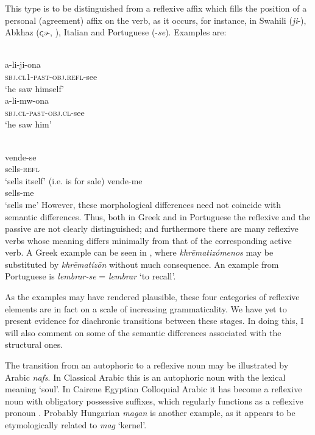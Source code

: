 This type is to be distinguished from a reflexive affix which fills the position of a personal (agreement) affix on the verb, as it occurs, for instance, in Swahili (\textit{ji}{}-), Abkhaz (\textit{\k{c}ə}{}-, \citealt[77]{Hewitt1979}), Italian and Portuguese (-\textit{se}). Examples are:

\ea\label{ex:E19}
\langinfo{\LangSwah}{}{} \\
 \ea
 \gll a-li-ji-ona  \\
\textsc{sbj}.\textsc{cl}1-\textsc{past}-\textsc{obj}.\textsc{refl}-see\\
\glt ‘he saw himself’\\
\ex
\gll a-li-mw-ona \\
 \textsc{sbj}.\textsc{cl}-\textsc{past}-\textsc{obj}.\textsc{cl}-see \\
 \glt ‘he saw him’\\
\z
\z


\ea\label{ex:E20}
\langinfo{\LangPort}{}{}  \\
 \ea
 \gll vende-se  \\
 sells-\textsc{refl}  \\
\glt ‘sells itself’ (i.e. is for sale)
\ex 
\gll vende-me \\
sells-me \\
\glt ‘sells me’
\z
\z
\noindent However, these morphological differences need not coincide with semantic differences. Thus, both in Greek and in Portuguese the reflexive and the passive are not clearly distinguished; and furthermore there are many reflexive verbs whose meaning differs minimally from that of the corresponding active verb. A Greek example can be seen in , where \textit{khr\=ematizómenos} may be substituted by \textit{khrēmatízōn} without much consequence. An example from Portuguese is \textit{lembrar-se} = \textit{lembrar} ‘to recall’.

As the examples may have rendered plausible, these four categories of reflexive elements are in fact on a scale of increasing grammaticality. We have yet to present evidence for diachronic transitions between these stages. In doing this, I will also comment on some of the semantic differences associated with the structural ones.

The transition from an autophoric to a reflexive noun may be illustrated by Arabic \textit{nafs}. In Classical Arabic this is an autophoric noun with the lexical meaning ‘soul’. In Cairene Egyptian Colloquial Arabic it has become a reflexive noun with obligatory possessive suffixes, which regularly functions as a reflexive pronoun \citep[80f]{GaryEtAl1982}. Probably Hungarian \textit{magan} is another example, as it appears to be etymologically related to \textit{mag} ‘kernel’.

